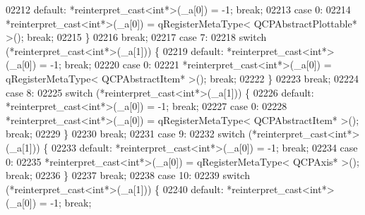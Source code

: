 \begin{DoxyCode}
02212             \textcolor{keywordflow}{default}: *\textcolor{keyword}{reinterpret\_cast<}\textcolor{keywordtype}{int}*\textcolor{keyword}{>}(\_a[0]) = -1; \textcolor{keywordflow}{break};
02213             \textcolor{keywordflow}{case} 0:
02214                 *\textcolor{keyword}{reinterpret\_cast<}\textcolor{keywordtype}{int}*\textcolor{keyword}{>}(\_a[0]) = qRegisterMetaType< QCPAbstractPlottable* >(); \textcolor{keywordflow}{break};
02215             \}
02216             \textcolor{keywordflow}{break};
02217         \textcolor{keywordflow}{case} 7:
02218             \textcolor{keywordflow}{switch} (*reinterpret\_cast<int*>(\_a[1])) \{
02219             \textcolor{keywordflow}{default}: *\textcolor{keyword}{reinterpret\_cast<}\textcolor{keywordtype}{int}*\textcolor{keyword}{>}(\_a[0]) = -1; \textcolor{keywordflow}{break};
02220             \textcolor{keywordflow}{case} 0:
02221                 *\textcolor{keyword}{reinterpret\_cast<}\textcolor{keywordtype}{int}*\textcolor{keyword}{>}(\_a[0]) = qRegisterMetaType< QCPAbstractItem* >(); \textcolor{keywordflow}{break};
02222             \}
02223             \textcolor{keywordflow}{break};
02224         \textcolor{keywordflow}{case} 8:
02225             \textcolor{keywordflow}{switch} (*reinterpret\_cast<int*>(\_a[1])) \{
02226             \textcolor{keywordflow}{default}: *\textcolor{keyword}{reinterpret\_cast<}\textcolor{keywordtype}{int}*\textcolor{keyword}{>}(\_a[0]) = -1; \textcolor{keywordflow}{break};
02227             \textcolor{keywordflow}{case} 0:
02228                 *\textcolor{keyword}{reinterpret\_cast<}\textcolor{keywordtype}{int}*\textcolor{keyword}{>}(\_a[0]) = qRegisterMetaType< QCPAbstractItem* >(); \textcolor{keywordflow}{break};
02229             \}
02230             \textcolor{keywordflow}{break};
02231         \textcolor{keywordflow}{case} 9:
02232             \textcolor{keywordflow}{switch} (*reinterpret\_cast<int*>(\_a[1])) \{
02233             \textcolor{keywordflow}{default}: *\textcolor{keyword}{reinterpret\_cast<}\textcolor{keywordtype}{int}*\textcolor{keyword}{>}(\_a[0]) = -1; \textcolor{keywordflow}{break};
02234             \textcolor{keywordflow}{case} 0:
02235                 *\textcolor{keyword}{reinterpret\_cast<}\textcolor{keywordtype}{int}*\textcolor{keyword}{>}(\_a[0]) = qRegisterMetaType< QCPAxis* >(); \textcolor{keywordflow}{break};
02236             \}
02237             \textcolor{keywordflow}{break};
02238         \textcolor{keywordflow}{case} 10:
02239             \textcolor{keywordflow}{switch} (*reinterpret\_cast<int*>(\_a[1])) \{
02240             \textcolor{keywordflow}{default}: *\textcolor{keyword}{reinterpret\_cast<}\textcolor{keywordtype}{int}*\textcolor{keyword}{>}(\_a[0]) = -1; \textcolor{keywordflow}{break};

\end{DoxyCode}
